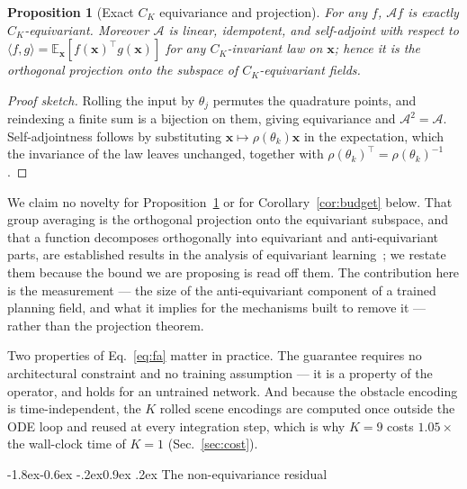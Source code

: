 \documentclass[10pt,twocolumn,letterpaper]{article}
\makeatletter
\renewcommand\subsection{\@startsection{subsection}{2}{\z@}%
  {-1.8ex\@plus -0.6ex \@minus -.2ex}{0.9ex \@plus .2ex}%
  {\normalfont\normalsize\bfseries}}
\theoremstyle{plain}
\newtheorem{proposition}{Proposition}
\makeatother
\begin{document}
\begin{proposition}[Exact $C_K$ equivariance and projection]
\label{prop:fa}
For any $f$, $\mathcal{A}f$ is exactly $C_K$-equivariant. Moreover $\mathcal{A}$
is linear, idempotent, and self-adjoint with respect to
$\langle f,g\rangle=\mathbb{E}_{\mathbf{x}}\left[f(\mathbf{x})^\top g(\mathbf{x})\right]$
for any $C_K$-invariant law on $\mathbf{x}$; hence it is the orthogonal projection
onto the subspace of $C_K$-equivariant fields.
\end{proposition}

\begin{proof}[Proof sketch]
Rolling the input by $\theta_j$ permutes the quadrature points, and reindexing a
finite sum is a bijection on them, giving equivariance and $\mathcal{A}^2=\mathcal{A}$.
Self-adjointness follows by substituting $\mathbf{x}\mapsto\rho(\theta_k)\mathbf{x}$
in the expectation, which the invariance of the law leaves unchanged, together
with $\rho(\theta_k)^\top=\rho(\theta_k)^{-1}$.
\end{proof}

We claim no novelty for Proposition~\ref{prop:fa} or for
Corollary~\ref{cor:budget} below. That group averaging is the orthogonal
projection onto the equivariant subspace, and that a function decomposes
orthogonally into equivariant and anti-equivariant parts, are established
results in the analysis of equivariant
learning~\cite{elesedy2021strict,puny2022fa}; we restate them because the
bound we are proposing is read off them. The contribution here is the
measurement --- the size of the anti-equivariant component of a trained planning
field, and what it implies for the mechanisms built to remove it --- rather than
the projection theorem.

Two properties of Eq.~\eqref{eq:fa} matter in practice. The guarantee requires no
architectural constraint and no training assumption --- it is a property of the
operator, and holds for an untrained network. And because the obstacle encoding is
time-independent, the $K$ rolled scene encodings are computed once outside the ODE
loop and reused at every integration step, which is why $K{=}9$ costs $1.05\times$
the wall-clock time of $K{=}1$ (Sec.~\ref{sec:cost}).

\subsection{The non-equivariance residual}
\label{sec:residual}
\end{document}
